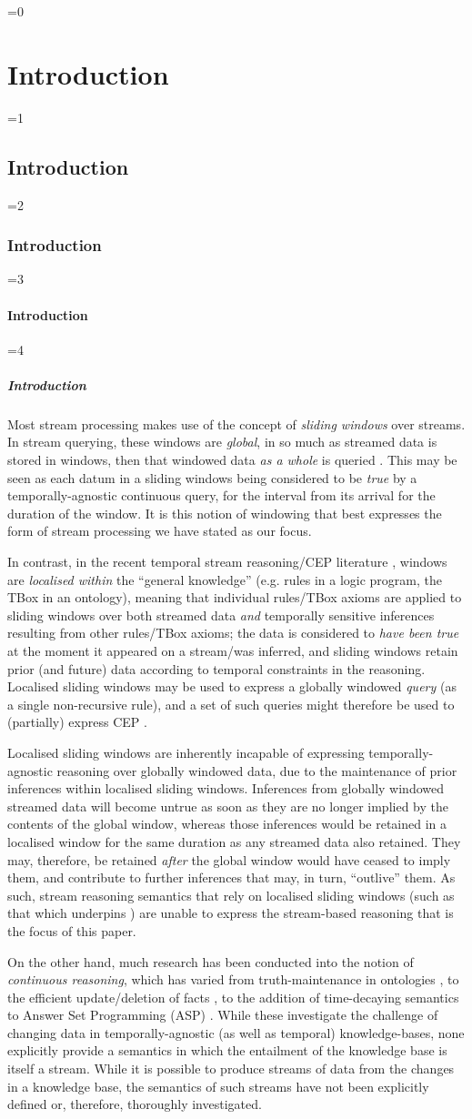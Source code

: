 \documentclass[twocolumn,preprint,3p,number]{elsarticle}
\theoremstyle{plain}
\theoremstyle{definition}
\newcounter{nestingdepth}
\newenvironment{nestedsection}[2]{
  \ifnum\value{nestingdepth}=0
    \chapter{#1}
  \else
    \ifnum\value{nestingdepth}=1
      \section{#1}
    \else
      \ifnum\value{nestingdepth}=2
        \subsection{#1}
      \else
        \ifnum\value{nestingdepth}=3
          \subsubsection{#1}
        \else
          \ifnum\value{nestingdepth}=4
            \paragraph{#1}
          \else
            \PackageError{nestedsections}{Maximum nesting level exceeded!}{uh oh!}
          \fi
        \fi
      \fi
    \fi
  \fi
  \addtocounter{nestingdepth}{1}
  \label{sec:#2}
}{\addtocounter{nestingdepth}{-1}}
\begin{document}
\begin{nestedsection}{Introduction}{intro}
  Most stream processing makes use of the concept of \emph{sliding windows} over streams.
  In stream querying, these windows are \emph{global}, in so much as streamed data is stored in windows, then that windowed data \emph{as a whole} is queried \citep{C-SPARQL,EP-SPARQL,CQELS}.
  This may be seen as each datum in a sliding windows being considered to be \emph{true} by a temporally-agnostic continuous query, for the interval from its arrival for the duration of the window.
  It is this notion of windowing that best expresses the form of stream processing we have stated as our focus.

  In contrast, in the recent temporal stream reasoning/CEP literature \citep{LARS}, windows are \emph{localised within} the ``general knowledge'' (e.g. rules in a logic program, the TBox in an ontology), meaning that individual rules/TBox axioms are applied to sliding windows over both streamed data \emph{and} temporally sensitive inferences resulting from other rules/TBox axioms;
  the data is considered to \emph{have been true} at the moment it appeared on a stream/was inferred, and sliding windows retain prior (and future) data according to temporal constraints in the reasoning.
  Localised sliding windows may be used to express a globally windowed \emph{query} (as a single non-recursive rule), and a set of such queries might therefore be used to (partially) express CEP \citep{C-SPARQL,EP-SPARQL,walavalkar08streamingkb,LARS}.
  
  Localised sliding windows are inherently incapable of expressing temporally-agnostic reasoning over globally windowed data, due to the maintenance of prior inferences within localised sliding windows.
  Inferences from globally windowed streamed data will become untrue as soon as they are no longer implied by the contents of the global window, whereas those inferences would be retained in a localised window for the same duration as any streamed data also retained.
  They may, therefore, be retained \emph{after} the global window would have ceased to imply them, and contribute to further inferences that may, in turn, ``outlive'' them.
  As such, stream reasoning semantics that rely on localised sliding windows (such as that which underpins \citep{LARS}) are unable to express the stream-based reasoning that is the focus of this paper.

  On the other hand, much research has been conducted into the notion of \emph{continuous reasoning}, which has varied from truth-maintenance in ontologies \citep{stream-truth-maintenance}, to the efficient update/deletion of facts \citep{dred,inc-materialisation,ahmeti14rdfsUpdate}, to the addition of time-decaying semantics to Answer Set Programming (ASP) \citep{gebser12streamASP}.
  While these investigate the challenge of changing data in temporally-agnostic (as well as temporal) knowledge-bases, none explicitly provide a semantics in which the entailment of the knowledge base is itself a stream.
  While it is possible to produce streams of data from the changes in a knowledge base, the semantics of such streams have not been explicitly defined or, therefore, thoroughly investigated.


\end{nestedsection}
\end{document}
